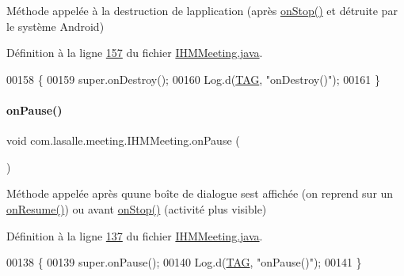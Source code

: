 Méthode appelée à la destruction de l\textquotesingle{}application (après \hyperlink{classcom_1_1lasalle_1_1meeting_1_1_i_h_m_meeting_a74e6b3e48ce9a26612916194d4692e6a}{on\+Stop()} et détruite par le système Android) 



Définition à la ligne \hyperlink{_i_h_m_meeting_8java_source_l00157}{157} du fichier \hyperlink{_i_h_m_meeting_8java_source}{I\+H\+M\+Meeting.\+java}.


\begin{DoxyCode}
00158     \{
00159         super.onDestroy();
00160         Log.d(\hyperlink{classcom_1_1lasalle_1_1meeting_1_1_i_h_m_meeting_a239eafcb0ccc896bdba538d1c0f08e65}{TAG}, \textcolor{stringliteral}{"onDestroy()"});
00161     \}
\end{DoxyCode}
\mbox{\label{classcom_1_1lasalle_1_1meeting_1_1_i_h_m_meeting_a1663a4b9bcff059ab95a72ca019cffb1}} 
\paragraph{\texorpdfstring{on\+Pause()}{onPause()}}
{\footnotesize\ttfamily void com.\+lasalle.\+meeting.\+I\+H\+M\+Meeting.\+on\+Pause (\begin{DoxyParamCaption}{ }\end{DoxyParamCaption})\hspace{0.3cm}{\ttfamily [protected]}}



Méthode appelée après qu\textquotesingle{}une boîte de dialogue s\textquotesingle{}est affichée (on reprend sur un \hyperlink{classcom_1_1lasalle_1_1meeting_1_1_i_h_m_meeting_af9a99a4aa01c58f7d85e0d6e6d13eaa4}{on\+Resume()}) ou avant \hyperlink{classcom_1_1lasalle_1_1meeting_1_1_i_h_m_meeting_a74e6b3e48ce9a26612916194d4692e6a}{on\+Stop()} (activité plus visible) 



Définition à la ligne \hyperlink{_i_h_m_meeting_8java_source_l00137}{137} du fichier \hyperlink{_i_h_m_meeting_8java_source}{I\+H\+M\+Meeting.\+java}.


\begin{DoxyCode}
00138     \{
00139         super.onPause();
00140         Log.d(\hyperlink{classcom_1_1lasalle_1_1meeting_1_1_i_h_m_meeting_a239eafcb0ccc896bdba538d1c0f08e65}{TAG}, \textcolor{stringliteral}{"onPause()"});
00141     \}
\end{DoxyCode}
\mbox{\label{classcom_1_1lasalle_1_1meeting_1_1_i_h_m_meeting_af9a99a4aa01c58f7d85e0d6e6d13eaa4}} 
